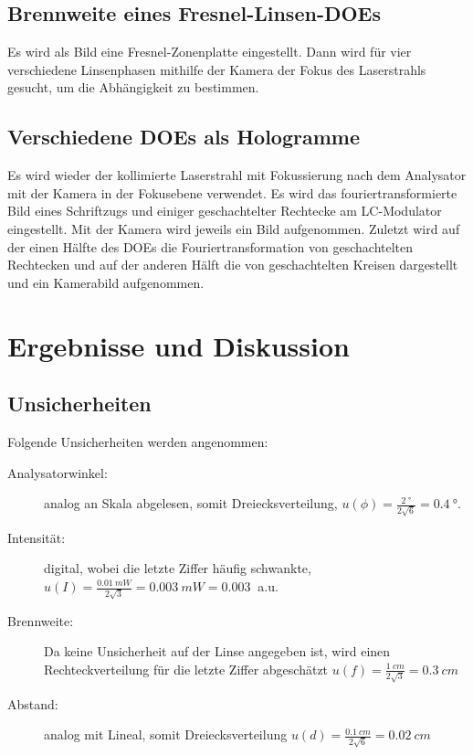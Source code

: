 \documentclass[
	a4paper,
	12pt,
	pagesize,
	ngerman
]{scrartcl}
\begin{document}
	\subsection{Brennweite eines Fresnel-Linsen-DOEs}
		Es wird als Bild eine Fresnel-Zonenplatte eingestellt.
		Dann wird für vier verschiedene Linsenphasen mithilfe der Kamera der Fokus des Laserstrahls gesucht, um die Abhängigkeit zu bestimmen.

	\subsection{Verschiedene DOEs als Hologramme}
		Es wird wieder der kollimierte Laserstrahl mit Fokussierung nach dem Analysator mit der Kamera in der Fokusebene verwendet.
		Es wird das fouriertransformierte Bild eines Schriftzugs und einiger geschachtelter Rechtecke am LC-Modulator eingestellt. %
		Mit der Kamera wird jeweils ein Bild aufgenommen.
		Zuletzt wird auf der einen Hälfte des DOEs die Fouriertransformation von geschachtelten Rechtecken und auf der anderen Hälft die von geschachtelten Kreisen dargestellt und ein Kamerabild aufgenommen.



	\section{Ergebnisse und Diskussion}
		\subsection*{Unsicherheiten}

	Folgende Unsicherheiten werden angenommen:
	\begin{description}
		\item[Analysatorwinkel:] analog an Skala abgelesen, somit Dreiecksverteilung, $u(\phi)=\frac{\SI{2}{\degree}}{2\sqrt{6}}=\SI{0.4}{\degree}$.
		\item[Intensität:] digital, wobei die letzte Ziffer häufig schwankte, $u(I)=\frac{\SI{0.01}{mW}}{2\sqrt{3}}=\SI{0.003}{mW}=\SI{0.003}{}$ a.u.
		\item[Brennweite:] Da keine Unsicherheit auf der Linse angegeben ist, wird einen Rechteckverteilung für die letzte Ziffer abgeschätzt $u(f)=\frac{\SI{1}{cm}}{2\sqrt{3}}= \SI{0.3}{cm}$
		\item[Abstand:] analog mit Lineal, somit Dreiecksverteilung $u(d)=\frac{\SI{0.1}{cm}}{2\sqrt{6}}= \SI{0.02}{cm}$
	\end{description}
\end{document}
